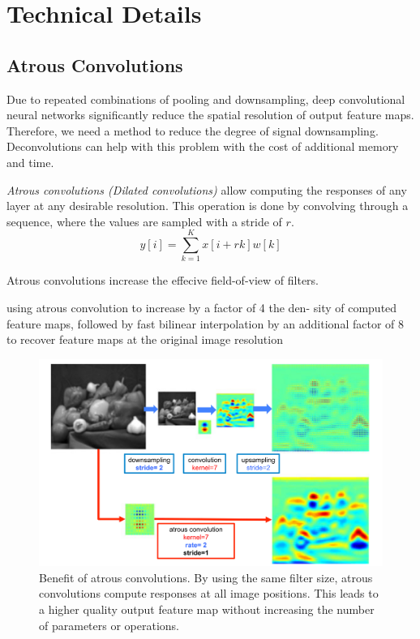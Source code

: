\documentclass[10pt,twocolumn,letterpaper]{article}
\begin{document}
\section{Technical Details}
\subsection{Atrous Convolutions}
Due to repeated combinations of pooling and downsampling, deep convolutional neural networks
significantly reduce the spatial resolution of output feature maps. Therefore, we need a method
to reduce the degree of signal downsampling. Deconvolutions can help with this problem with
the cost of additional memory and time.

\emph{Atrous convolutions (Dilated convolutions)} allow computing the responses of any
layer at any desirable resolution. This operation is done by convolving through a
sequence, where the values are sampled with a stride of $r$.
\[
    y[i] = \sum_{k=1}^K{x[i + rk]w[k]}
\]

Atrous convolutions increase the effecive field-of-view of filters.

using atrous convolution to increase by a factor of 4 the den- sity of computed feature maps, followed by fast bilinear interpolation by an additional factor of 8 to recover feature maps at the original image resolution

\begin{figure}[ht]
  \centering
   \includegraphics[width=\linewidth]{figures/atrous-convolution.jpeg}
   \caption{Benefit of atrous convolutions. By using the same filter size, atrous convolutions
       compute responses at all image positions. This leads to a higher quality output feature
       map without increasing the number of parameters or operations.
   }
\end{figure}
\end{document}
